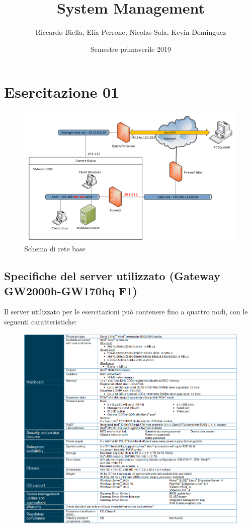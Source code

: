 \documentclass{article}
\title{\Huge System Management \vspace{1cm}}
\author{Riccardo Biella, Elia Perrone, Nicolas Sala, Kevin Dominguez}
\date{Semestre primaverile 2019}
\begin{document}
\maketitle
\thispagestyle{empty}
\pagebreak

\section{Esercitazione 01}

\begin{figure}[H]
    \center
    \includegraphics[scale=0.3]{images/schemaRete.png}
    \caption{Schema di rete base}\label{fig:1}
\end{figure}

\subsection{Specifiche del server utilizzato (Gateway GW2000h-GW170hq F1)}
Il server utilizzato per le esercitazioni può contenere fino a quattro nodi, con le seguenti caratteristiche:
\begin{figure}[H]
    \center
    \includegraphics[scale=0.37]{images/specificheServer.png}
\end{figure}
\end{document}
